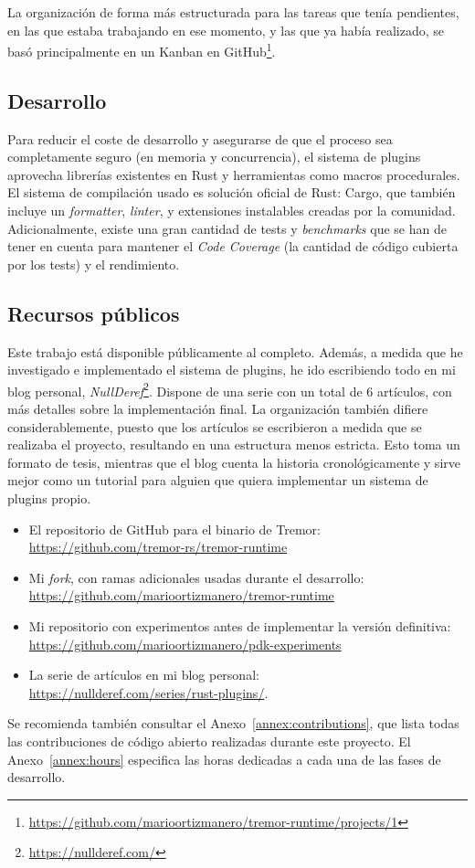 La organización de forma más estructurada para las tareas que tenía pendientes,
en las que estaba trabajando en ese momento, y las que ya había realizado, se
basó principalmente en un Kanban en
GitHub\footnote{\url{https://github.com/marioortizmanero/tremor-runtime/projects/1}}.

\subsection{Desarrollo}

Para reducir el coste de desarrollo y asegurarse de que el proceso sea
completamente seguro (en memoria y concurrencia), el sistema de plugins
aprovecha librerías existentes en Rust y herramientas como macros procedurales.
El sistema de compilación usado es solución oficial de Rust: Cargo, que también
incluye un \emph{formatter}, \emph{linter}, y extensiones instalables creadas
por la comunidad. Adicionalmente, existe una gran cantidad de tests y
\emph{benchmarks} que se han de tener en cuenta para mantener el \emph{Code
Coverage} (la cantidad de código cubierta por los tests) y el rendimiento.

\subsection{Recursos públicos}

Este trabajo está disponible públicamente al completo. Además, a medida que he
investigado e implementado el sistema de plugins, he ido escribiendo todo en mi
blog personal, \emph{NullDeref}\footnote{\url{https://nullderef.com/}}. Dispone
de una serie con un total de 6 artículos, con más detalles sobre la
implementación final. La organización también difiere considerablemente, puesto
que los artículos se escribieron a medida que se realizaba el proyecto,
resultando en una estructura menos estricta. Esto toma un formato de tesis,
mientras que el blog cuenta la historia cronológicamente y sirve mejor como un
tutorial para alguien que quiera implementar un sistema de plugins propio.

\begin{itemize}
    \item El repositorio de GitHub para el binario de Tremor:\\
        \url{https://github.com/tremor-rs/tremor-runtime}
    \item Mi \emph{fork}, con ramas adicionales usadas durante el desarrollo:\\
        \url{https://github.com/marioortizmanero/tremor-runtime}
    \item Mi repositorio con experimentos antes de implementar la versión
        definitiva:\\
        \url{https://github.com/marioortizmanero/pdk-experiments}
    \item La serie de artículos en mi blog personal:\\
        \url{https://nullderef.com/series/rust-plugins/}.
\end{itemize}

Se recomienda también consultar el Anexo~\ref{annex:contributions}, que lista
todas las contribuciones de código abierto realizadas durante este proyecto. El
Anexo~\ref{annex:hours} especifica las horas dedicadas a cada una de las fases
de desarrollo.
